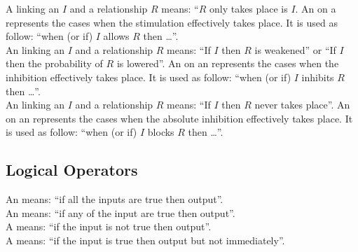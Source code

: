 \noindent
A  linking an  $I$ and a relationship $R$ means: ``$R$ only takes place is $I$. An  on a  represents the cases when the stimulation effectively takes place. It is used as follow: ``when (or if) $I$ allows $R$ then \ldots''.\\[\baselineskip]

\noindent
An  linking an  $I$ and a relationship $R$ means: ``If $I$ then $R$ is weakened'' or ``If $I$ then the probability of $R$ is lowered''. An  on an  represents the cases when the inhibition effectively takes place. It is used as follow: ``when (or if) $I$ inhibits $R$ then \ldots''.\\[\baselineskip]

\noindent
An  linking an  $I$ and a relationship $R$ means: ``If $I$ then $R$ never takes place''. An  on an  represents the cases when the absolute inhibition effectively takes place. It is used as follow: ``when (or if) $I$ blocks $R$ then \ldots''.\\[\baselineskip]

\subsection{Logical Operators}

An  means: ``if all the inputs are true then output''.\\[\baselineskip]

\noindent
An  means: ``if any of the input are true then output''.\\[\baselineskip]

\noindent
A  means: ``if the input is not true then output''.\\[\baselineskip]

\noindent
A  means: ``if the input is true then output but not immediately''.\\[\baselineskip]
\normalcolor